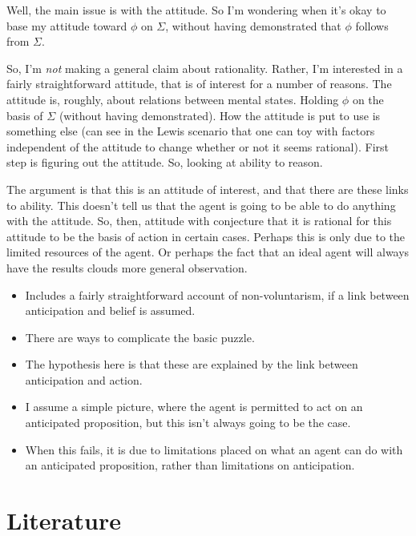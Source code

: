 \documentclass[10pt]{article}
\begin{document}
{{    Well, the main issue is with the attitude.
    So I'm wondering when it's okay to base my attitude toward \(\phi\) on \(\Sigma\), without having demonstrated that \(\phi\) follows from \(\Sigma\).

    So, I'm \emph{not} making a general claim about rationality.
    Rather, I'm interested in a fairly straightforward attitude, that is of interest for a number of reasons.
    The attitude is, roughly, about relations between mental states.
    Holding \(\phi\) on the basis of \(\Sigma\) (without having demonstrated).
    How the attitude is put to use is something else (can see in the Lewis scenario that one can toy with factors independent of the attitude to change whether or not it seems rational).
    First step is figuring out the attitude.
    So, looking at ability to reason.

    The argument is that this is an attitude of interest, and that there are these links to ability.
    This doesn't tell us that the agent is going to be able to do anything with the attitude.
    So, then, attitude with conjecture that it is rational for this attitude to be the basis of action in certain cases.
    Perhaps this is only due to the limited resources of the agent.
    Or perhaps the fact that an ideal agent will always have the results clouds more general observation.
  }
}


\begin{itemize}
\item Includes a fairly straightforward account of non-voluntarism, if a link between anticipation and belief is assumed.
\end{itemize}


\begin{itemize}
\item There are ways to complicate the basic puzzle.
\item The hypothesis here is that these are explained by the link between anticipation and action.
\item I assume a simple picture, where the agent is permitted to act on an anticipated proposition, but this isn't always going to be the case.
\item When this fails, it is due to limitations placed on what an agent can do with an anticipated proposition, rather than limitations on anticipation.
\end{itemize}



\newpage


\section{Literature}
\label{sec:literature}
\end{document}
